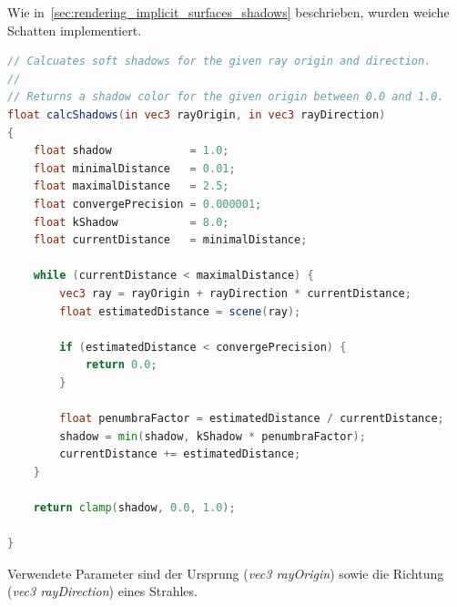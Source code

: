 Wie in~\autoref{sec:rendering_implicit_surfaces_shadows} beschrieben,
wurden weiche Schatten implementiert.

\begin{minipage}{\linewidth}
\begin{lstlisting}[language=GLSL,caption={Funktion zur Berechnung von
        weichen Schatten  in
        GLSL.},label={alg:glsl_soft_shadows},captionpos=b,emph={calcShadows}]
// Calcuates soft shadows for the given ray origin and direction.
//
// Returns a shadow color for the given origin between 0.0 and 1.0.
float calcShadows(in vec3 rayOrigin, in vec3 rayDirection)
{
    float shadow            = 1.0;
    float minimalDistance   = 0.01;
    float maximalDistance   = 2.5;
    float convergePrecision = 0.000001;
    float kShadow           = 8.0;
    float currentDistance   = minimalDistance;

    while (currentDistance < maximalDistance) {
        vec3 ray = rayOrigin + rayDirection * currentDistance;
        float estimatedDistance = scene(ray);

        if (estimatedDistance < convergePrecision) {
            return 0.0;
        }

        float penumbraFactor = estimatedDistance / currentDistance;
        shadow = min(shadow, kShadow * penumbraFactor);
        currentDistance += estimatedDistance;
    }

    return clamp(shadow, 0.0, 1.0);

}
\end{lstlisting}
\end{minipage}

Verwendete Parameter sind der Ursprung (\textit{vec3 rayOrigin}) sowie
die Richtung (\textit{vec3 rayDirection}) eines Strahles.

